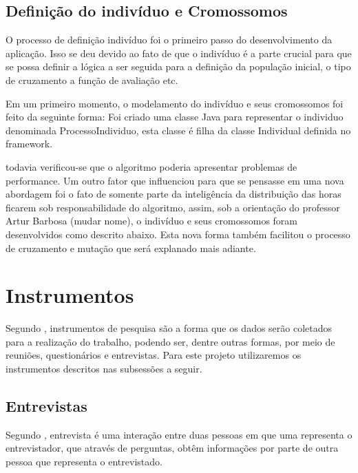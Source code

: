 \subsection{Definição do indivíduo e Cromossomos}
\par O processo de definição indivíduo foi o primeiro passo do desenvolvimento da aplicação. Isso 
se deu devido ao fato de que o indivíduo é a parte crucial para que se possa definir a lógica a ser seguida para
a definição da população inicial, o tipo de cruzamento a função de avaliação etc.
 

\par Em um primeiro momento, o modelamento do indivíduo e seus cromossomos foi feito da seguinte forma:
Foi criado uma classe Java para representar o individuo denominada ProcessoIndividuo, esta classe é filha 
da classe Individual definida no framework.




todavia verificou-se que o algoritmo poderia apresentar problemas de performance. Um outro fator que 
influenciou para que se pensasse em uma nova abordagem foi o fato de somente parte da inteligência da distribuição
das horas ficarem sob responsabilidade do algoritmo, assim, sob a orientação do professor Artur Barbosa (mudar nome), 
o indivíduo e seus cromossomos foram desenvolvidos como descrito abaixo. Esta nova forma também facilitou o processo 
de cruzamento e mutação que será explanado mais adiante.


\section{Instrumentos}

\par Segundo , instrumentos de pesquisa são a
forma que os dados serão coletados para a realização do trabalho, podendo ser,
dentre outras formas, por meio de reuniões, questionários e entrevistas. Para
este projeto utilizaremos os instrumentos descritos nas subsessões a seguir.

\subsection{Entrevistas}
\par Segundo , entrevista é
uma interação entre duas pessoas em que uma representa o entrevistador, 
que através de perguntas, obtêm informações por parte de outra pessoa que
representa o entrevistado.


